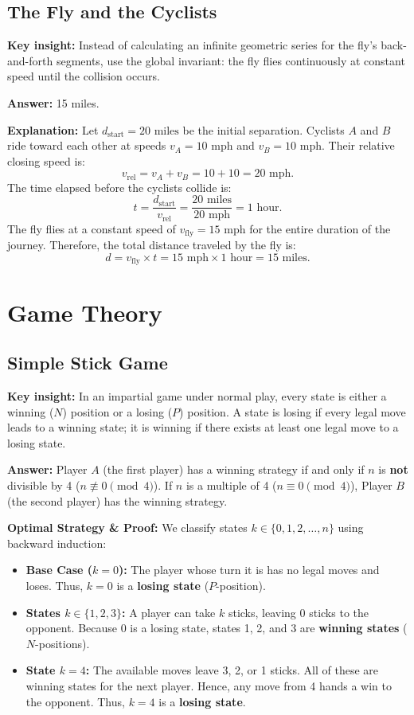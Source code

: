 \documentclass[12pt]{article}
\newcommand{\insight}[1]{\par\medskip\noindent\textbf{Key insight:} #1}
\begin{document}
\subsection{The Fly and the Cyclists}

\insight{Instead of calculating an infinite geometric series for the fly's back-and-forth segments, use the global invariant: the fly flies continuously at constant speed until the collision occurs.}

\textbf{Answer:} 15 miles.

\textbf{Explanation:}
Let $d_{\text{start}} = 20\text{ miles}$ be the initial separation. Cyclists $A$ and $B$ ride toward each other at speeds $v_A = 10\text{ mph}$ and $v_B = 10\text{ mph}$.
Their relative closing speed is:
\[
v_{\text{rel}} = v_A + v_B = 10 + 10 = 20\text{ mph}.
\]
The time elapsed before the cyclists collide is:
\[
t = \frac{d_{\text{start}}}{v_{\text{rel}}} = \frac{20\text{ miles}}{20\text{ mph}} = 1\text{ hour}.
\]
The fly flies at a constant speed of $v_{\text{fly}} = 15\text{ mph}$ for the entire duration of the journey. Therefore, the total distance traveled by the fly is:
\[
d = v_{\text{fly}} \times t = 15\text{ mph} \times 1\text{ hour} = 15\text{ miles}.
\]

\section{Game Theory}

\subsection{Simple Stick Game}

\insight{In an impartial game under normal play, every state is either a winning ($N$) position or a losing ($P$) position. A state is losing if every legal move leads to a winning state; it is winning if there exists at least one legal move to a losing state.}

\textbf{Answer:} Player $A$ (the first player) has a winning strategy if and only if $n$ is \textbf{not} divisible by 4 ($n \not\equiv 0 \pmod 4$). If $n$ is a multiple of 4 ($n \equiv 0 \pmod 4$), Player $B$ (the second player) has the winning strategy.

\textbf{Optimal Strategy \& Proof:}
We classify states $k \in \{0, 1, 2, \dots, n\}$ using backward induction:
\begin{itemize}
    \item \textbf{Base Case ($k = 0$):} The player whose turn it is has no legal moves and loses. Thus, $k = 0$ is a \textbf{losing state} ($P$-position).
    \item \textbf{States $k \in \{1, 2, 3\}$:} A player can take $k$ sticks, leaving 0 sticks to the opponent. Because 0 is a losing state, states 1, 2, and 3 are \textbf{winning states} ($N$-positions).
    \item \textbf{State $k = 4$:} The available moves leave 3, 2, or 1 sticks. All of these are winning states for the next player. Hence, any move from 4 hands a win to the opponent. Thus, $k = 4$ is a \textbf{losing state}.
\end{itemize}
\end{document}

